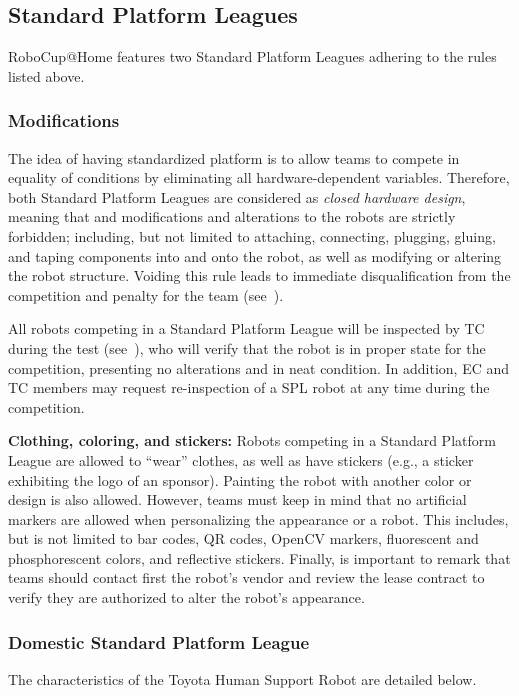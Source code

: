 \subsection{Standard Platform Leagues}
RoboCup@Home features two Standard Platform Leagues adhering to the rules listed above.

\subsubsection{Modifications}
\label{rule:spl-mods}
The idea of having standardized platform is to allow teams to compete in equality of conditions by eliminating all hardware-dependent variables. Therefore, both Standard Platform Leagues are considered as \emph{closed hardware design}, meaning that and modifications and alterations to the robots are strictly forbidden; including, but not limited to attaching, connecting, plugging, gluing, and taping components into and onto the robot, as well as modifying or altering the robot structure. Voiding this rule leads to immediate disqualification from the competition and penalty for the team (see~).

All robots competing in a Standard Platform League will be inspected by TC during the  test (see~), who will verify that the robot is in proper state for the competition, presenting no alterations and in neat condition. In addition, EC and TC members may request re-inspection of a SPL robot at any time during the competition.

\textbf{Clothing, coloring, and stickers:} Robots competing in a Standard Platform League are allowed to \enquote{wear} clothes, as well as have stickers (e.g., a sticker exhibiting the logo of an sponsor). Painting the robot with another color or design is also allowed. However, teams must keep in mind that no artificial markers are allowed when personalizing the appearance or a robot. This includes, but is not limited to bar codes, QR codes, OpenCV markers, fluorescent and phosphorescent colors, and reflective stickers. Finally, is important to remark that teams should contact first the robot's vendor and review the lease contract to verify they are authorized to alter the robot's appearance.

\subsubsection{Domestic Standard Platform League}
The characteristics of the Toyota Human Support Robot are detailed below.

